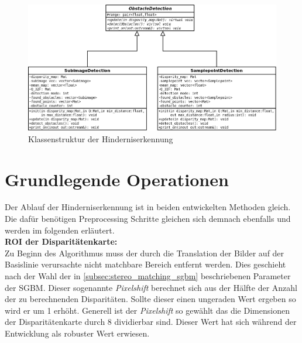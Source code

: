 \begin{figure}[h]
	\begin{center}
		\includegraphics[width=13cm]{img/class_structure}
	\end{center}
	\caption{Klassenstruktur der Hinderniserkennung}
	\label{fig:obstacle_detection_structure}
\end{figure}


\section{Grundlegende Operationen}
\label{sec:preprocessing}
Der Ablauf der Hinderniserkennung ist in beiden entwickelten Methoden gleich. Die dafür benötigen Preprocessing Schritte gleichen sich demnach ebenfalls und werden im folgenden erläutert.\\

\noindent
\textbf{ROI der Disparitätenkarte:}\\
Zu Beginn des Algorithmus muss der durch die Translation der Bilder auf der Basislinie verursachte nicht matchbare Bereich entfernt werden. Dies geschieht nach der Wahl der in \ref{subsec:stereo_matching_sgbm} beschriebenen Parameter der SGBM. Dieser sogenannte \emph{Pixelshift} berechnet sich aus der Hälfte der Anzahl der zu berechnenden Disparitäten. Sollte dieser einen ungeraden Wert ergeben so wird er um 1 erhöht. Generell ist der \emph{Pixelshift} so gewählt das die Dimensionen der Disparitätenkarte durch 8 dividierbar sind. Dieser Wert hat sich während der Entwicklung als robuster Wert erwiesen.\\

